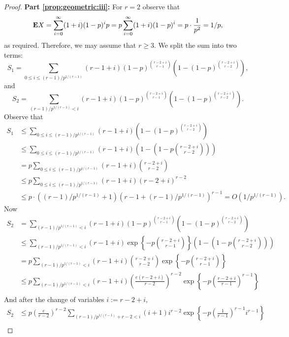 \documentclass[12pt,reqno]{amsart}
\theoremstyle{remark}
\def\E{\mbox{{\bf E}}}
\def\E{\mbox{{\bf E}}}
\begin{document}
\begin{proof}
\medskip
\textbf{Part \eqref{prop:geometric:iii}:}
For $r=2$ observe that 
\[
\E X=\sum_{i=0}^\infty (1+i) (1-p)^{i} p= p \sum_{i=0}^\infty (1+i) (1-p)^{i} = p\cdot \frac{1}{p^2} = 1/p,
\]
as required.
Therefore, we may assume that $r\ge 3$. We split the sum into two terms:
\[
S_1=\sum_{0\le i\le (r-1)/p^{1/(r-1)}} (r-1+i) (1-p)^{\binom{r-2+i}{r-1}} \left( 1-\left(1-p \right)^{\binom{r-2+i}{r-2}} \right),
\]
and
\[
S_2=\sum_{(r-1)/p^{1/(r-1)}<i} (r-1+i) (1-p)^{\binom{r-2+i}{r-1}} \left( 1-\left(1-p \right)^{\binom{r-2+i}{r-2}} \right).
\]
Observe that
\begin{align*}
S_1 &\le \sum_{0\le i\le (r-1)/p^{1/(r-1)}} (r-1+i) \left( 1-\left(1-p \right)^{\binom{r-2+i}{r-2}} \right)\\
&\le \sum_{0\le i\le (r-1)/p^{1/(r-1)}} (r-1+i) \left( 1-\left(1-p {\binom{r-2+i}{r-2}}\right) \right)\\
&= p \sum_{0\le i\le (r-1)/p^{1/(r-1)}} (r-1+i) \binom{r-2+i}{r-2}\\
&\le p \sum_{0\le i\le (r-1)/p^{1/(r-1)}} (r-1+i) (r-2+i)^{r-2}\\ 
&\le p \cdot \left((r-1)/p^{1/(r-1)} +1\right)\left(r-1+(r-1)/p^{1/(r-1)}\right)^{r-1} = O(1/p^{1/(r-1)}).
\end{align*}
Now
\begin{align*}
S_2 &= \sum_{(r-1)/p^{1/(r-1)}<i} (r-1+i) (1-p)^{\binom{r-2+i}{r-1}} \left( 1-\left(1-p \right)^{\binom{r-2+i}{r-2}} \right)\\
&\le \sum_{(r-1)/p^{1/(r-1)}<i} (r-1+i) \exp\left\{-p\binom{r-2+i}{r-1}\right\} \left( 1-\left(1-p {\binom{r-2+i}{r-2}}\right) \right)\\
&= p\sum_{(r-1)/p^{1/(r-1)}<i} (r-1+i) \binom{r-2+i}{r-2} \exp\left\{-p\binom{r-2+i}{r-1}\right\}\\
&\le p\sum_{(r-1)/p^{1/(r-1)}<i} (r-1+i) \left(\frac{e(r-2+i)}{r-2}\right)^{r-2} \exp\left\{-p\left(\frac{r-2+i}{r-1}\right)^{r-1}\right\}\\
\end{align*}
And after the change of variables $i:=r-2+i$,
\begin{align*}
S_2
&\le p\left(\frac{e}{r-2}\right)^{r-2}\sum_{(r-1)/p^{1/(r-1)}+r-2<i} (i+1) i^{r-2} \exp\left\{-p\left(\frac{1}{r-1}\right)^{r-1} i^{r-1}\right\}\\

\end{align*}
\end{proof}
\end{document}
